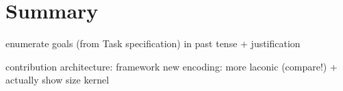 \chapter{Summary}
\label{ch:summary}

enumerate goals (from Task specification) in past tense + justification

contribution
  architecture:  framework
  new encoding: more laconic (compare!) + actually show size
  kernel
